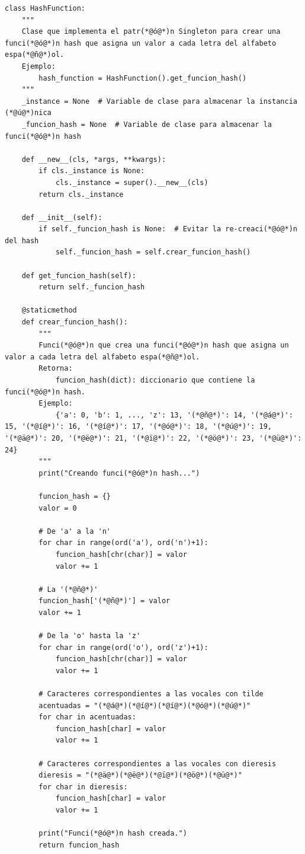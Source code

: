 \documentclass[10pt,times,twocolumn]{article}
\begin{document}
\begin{lstlisting}[caption={Función Hash}, xleftmargin=0.05\textwidth]
class HashFunction:
    """
    Clase que implementa el patr(*@ó@*)n Singleton para crear una funci(*@ó@*)n hash que asigna un valor a cada letra del alfabeto espa(*@ñ@*)ol.
    Ejemplo:
        hash_function = HashFunction().get_funcion_hash()
    """
    _instance = None  # Variable de clase para almacenar la instancia (*@ú@*)nica
    _funcion_hash = None  # Variable de clase para almacenar la funci(*@ó@*)n hash

    def __new__(cls, *args, **kwargs):
        if cls._instance is None:
            cls._instance = super().__new__(cls)
        return cls._instance

    def __init__(self):
        if self._funcion_hash is None:  # Evitar la re-creaci(*@ó@*)n del hash
            self._funcion_hash = self.crear_funcion_hash()

    def get_funcion_hash(self):
        return self._funcion_hash

    @staticmethod
    def crear_funcion_hash():
        """
        Funci(*@ó@*)n que crea una funci(*@ó@*)n hash que asigna un valor a cada letra del alfabeto espa(*@ñ@*)ol.
        Retorna:
            funcion_hash(dict): diccionario que contiene la funci(*@ó@*)n hash.
        Ejemplo:
            {'a': 0, 'b': 1, ..., 'z': 13, '(*@ñ@*)': 14, '(*@á@*)': 15, '(*@í@*)': 16, '(*@í@*)': 17, '(*@ó@*)': 18, '(*@ú@*)': 19, '(*@ä@*)': 20, '(*@ë@*)': 21, '(*@ï@*)': 22, '(*@ö@*)': 23, '(*@ü@*)': 24}
        """
        print("Creando funci(*@ó@*)n hash...")

        funcion_hash = {}
        valor = 0

        # De 'a' a la 'n'
        for char in range(ord('a'), ord('n')+1):
            funcion_hash[chr(char)] = valor
            valor += 1

        # La '(*@ñ@*)'
        funcion_hash['(*@ñ@*)'] = valor
        valor += 1

        # De la 'o' hasta la 'z'
        for char in range(ord('o'), ord('z')+1):
            funcion_hash[chr(char)] = valor
            valor += 1

        # Caracteres correspondientes a las vocales con tilde
        acentuadas = "(*@á@*)(*@í@*)(*@í@*)(*@ó@*)(*@ú@*)"
        for char in acentuadas:
            funcion_hash[char] = valor
            valor += 1

        # Caracteres correspondientes a las vocales con dieresis
        dieresis = "(*@ä@*)(*@ë@*)(*@ï@*)(*@ö@*)(*@ü@*)"
        for char in dieresis:
            funcion_hash[char] = valor
            valor += 1

        print("Funci(*@ó@*)n hash creada.")
        return funcion_hash
\end{lstlisting}
\end{document}
